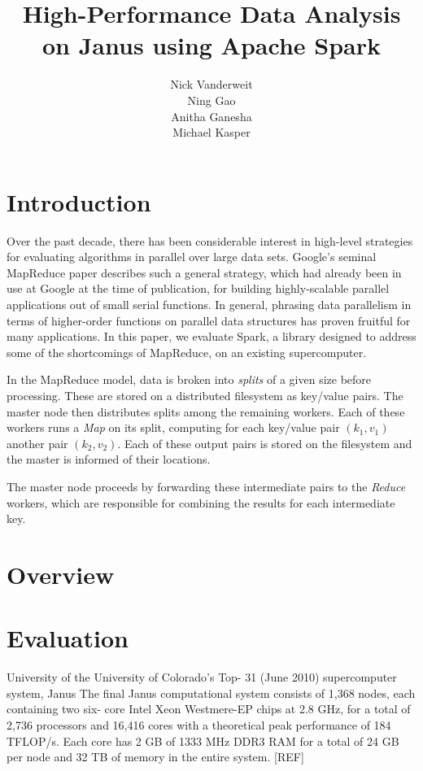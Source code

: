 \documentclass{article}
\title{High-Performance Data Analysis on Janus using Apache Spark}
\author{Nick Vanderweit \\
        Ning Gao \\
        Anitha Ganesha \\
        Michael Kasper}
\begin{document}
\maketitle

\section{Introduction}
Over the past decade, there has been considerable interest in high-level
strategies for evaluating algorithms in parallel over large data sets.
Google's seminal MapReduce paper \citep{dean-mapreduce} describes such a
general strategy, which had already been in use at Google at the time of
publication, for building highly-scalable parallel applications out of small
serial functions. In general, phrasing data parallelism in terms of
higher-order functions on parallel data structures has proven fruitful
for many applications. In this paper, we evaluate Spark, a library
designed to address some of the shortcomings of MapReduce, on an existing
supercomputer.

In the MapReduce model, data is broken into \emph{splits} of a given size
before processing. These are stored on a distributed filesystem as
key/value pairs. The master node then distributes splits among the remaining
workers. Each of these workers runs a \emph{Map} on its split, computing for each
key/value pair $(k_1, v_1)$ another pair $(k_2, v_2)$. Each of these output
pairs is stored on the filesystem and the master is informed of their
locations.

The master node proceeds by forwarding these intermediate pairs to the
\emph{Reduce} workers, which are responsible for combining the results
for each intermediate key.

\section{Overview}

\section{Evaluation}
University of the University of Colorado's Top-
31 (June 2010) supercomputer system, Janus
The final Janus computational
system consists of 1,368 nodes, each containing two six-
core Intel Xeon Westmere-EP chips at 2.8 GHz, for a total
of 2,736 processors and 16,416 cores with a theoretical
peak performance of 184 TFLOP/s. Each core has 2
GB of 1333 MHz DDR3 RAM for a total of 24 GB per
node and 32 TB of memory in the entire system. [REF]
\end{document}
